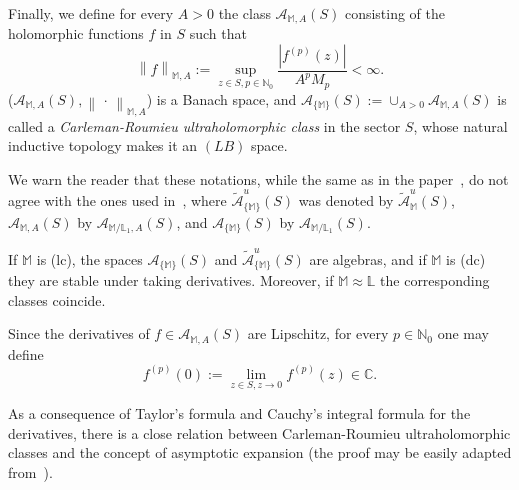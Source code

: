 \documentclass[11pt,a4paper]{article}
\theoremstyle{plain}
\theoremstyle{definition}
\newcommand{\N}{\mathbb{N}}
\newcommand{\C}{\mathbb{C}}
\newcommand{\M}{\mathbb{M}}
\newcommand{\bL}{\mathbb{L}}
\begin{document}
Finally, we define for every $A>0$ the class $\mathcal{A}_{\M,A}(S)$ consisting of the holomorphic functions $f$ in $S$ such that
$$
\left\|f\right\|_{\M,A}:=\sup_{z\in S,p\in\N_{0}}\frac{|f^{(p)}(z)|}{A^{p}M_{p}}<\infty.
$$
($\mathcal{A}_{\M,A}(S),\left\|\,\cdot\, \right\| _{\M,A}$) is a Banach space, and $\mathcal{A}_{\{\M\}}(S):=\cup_{A>0}\mathcal{A}_{\M,A}(S)$ is called a \emph{Carleman-Roumieu ultraholomorphic class} in the sector $S$, whose natural inductive topology makes it an $(LB)$ space.\par
We warn the reader that these notations, while the same as in the paper~\cite{JimenezSanzSchindlSurjectDC}, do not agree with the ones used in~\cite{SanzFlatProxOrder,JimenezSanzSchindlInjectSurject}, where
$\widetilde{\mathcal{A}}^u_{\{\M\}}(S)$ was denoted by
$\widetilde{\mathcal{A}}^u_{\M}(S)$, $\mathcal{A}_{\M,A}(S)$ by $\mathcal{A}_{\M/\bL_1,A}(S)$, and $\mathcal{A}_{\{\M\}}(S)$ by $\mathcal{A}_{\M/\bL_1}(S)$.

If $\M$ is (lc), the spaces $\mathcal{A}_{\{\M\}}(S)$ and $\widetilde{\mathcal{A}}^u_{\{\M\}}(S)$
are algebras, and if $\M$ is (dc) they are stable under taking derivatives.
Moreover, if $\M\approx\bL$ the corresponding classes coincide.

Since the derivatives of $f\in\mathcal{A}_{\M,A}(S)$ are Lipschitz, for every $p\in\N_{0}$ one may define
\begin{equation}\label{eq.deriv.at.0.def}
f^{(p)}(0):=\lim_{z\in S,z\to0 }f^{(p)}(z)\in\C.
\end{equation}

As a consequence of Taylor's formula and Cauchy's integral formula for the derivatives, there is a close relation between Carleman-Roumieu ultraholomorphic classes and the concept of asymptotic expansion (the proof may be easily adapted from~\cite{balserutx}).
\end{document}
